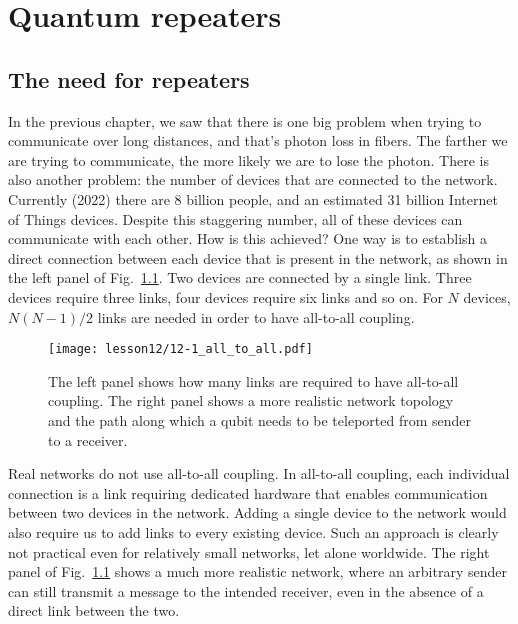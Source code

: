 \chapter{Quantum repeaters}
\label{sec:12_quantum_repeaters}
\label{ch:repeaters}

\section{The need for repeaters}
\label{sec:12-1_need_for_repeaters}

In the previous chapter, we saw that there is one big problem when trying to communicate over long distances, and that's photon loss in fibers.
The farther we are trying to communicate, the more likely we are to lose the photon.
There is also another problem: the number of devices that are connected to the network. Currently (2022) there are 8 billion people, and an estimated 31 billion Internet of Things devices.
Despite this staggering number, all of these devices can communicate with each other.
How is this achieved?
One way is to establish a direct connection between each device that is present in the network, as shown in the left panel of Fig.~\ref{fig:12-1_all_to_all}.
Two devices are connected by a single link.
Three devices require three links, four devices require six links and so on.
For $N$ devices, $N (N - 1) / 2$ links are needed in order to have all-to-all coupling.

\begin{figure}[t]
    \centering
    \texttt{[image: lesson12/12-1\_all\_to\_all.pdf]}
    \caption[All-to-all coupling]{The left panel shows how many links are required to have all-to-all coupling. The right panel shows a more realistic network topology and the path along which a qubit needs to be teleported from sender to a receiver.}
    \label{fig:12-1_all_to_all}
\end{figure}

Real networks do not use all-to-all coupling.
In all-to-all coupling, each individual connection is a link requiring dedicated hardware that enables communication between two devices in the network.
Adding a single device to the network would also require us to add links to every existing device.
Such an approach is clearly not practical even for relatively small networks, let alone worldwide.
The right panel of Fig.~\ref{fig:12-1_all_to_all} shows a much more realistic network, where an arbitrary sender can still transmit a message to the intended receiver, even in the absence of a direct link between the two.

